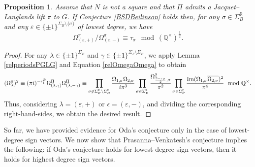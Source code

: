 \documentclass{amsart}
\newtheorem{proposition}[theorem]{Proposition}
\theoremstyle{definition}
\theoremstyle{remark}
\numberwithin{equation}{section}
\newcommand{\Q}{{\mathbb Q}}
\newcommand{\C}{{\mathbb C}}
\newcommand{\R}{{\mathbb R}}
\begin{document}
\begin{proposition}\label{Oda2}
 Assume that $N$ is not a square and that $\Pi$ admits a Jacquet--Langlands lift $\pi$ to $G$. If  Conjecture \ref{BSDBeilinson} holds then, for any $\sigma\in\Sigma_B^\R$ and any $\varepsilon\in\{\pm 1\}^{\Sigma_B\setminus\{\sigma\}}$ of lowest degree, we have 
\[
 \Omega^\pi_{(\varepsilon,+)}/\Omega^\pi_{(\varepsilon,-)}\equiv \tau_\sigma\mod(\Q^\times)^{\frac{1}{2}}.
\]
\end{proposition} 
\begin{proof}
For any $\lambda\in\{\pm 1\}^{\Sigma_B}$ and $\gamma\in\{\pm 1\}^{\Sigma_F\setminus\Sigma_B}$, we apply Lemma \ref{relperiodsPGLG} and Equation \eqref{relOmegaOmega} to obtain
\begin{equation}\label{RelOmegaGOmega}
    (\Omega_\lambda^\pi)^2\equiv (\pi i)^{-r_1^B}\Omega_{(\lambda,\gamma)}^\Pi\Omega_{(\lambda,-\gamma)}^\Pi\equiv\prod_{\sigma\not\in\Sigma_F^\R\setminus\Sigma_B^\R}\frac{\Omega_{1,\sigma}\Omega_{2,\sigma}}{i\pi^{3}}\prod_{\sigma\in\Sigma_B^\R}\frac{\Omega^2_{\frac{3-\varepsilon_\sigma}{2},\sigma}}{\pi^2}\prod_{\sigma\in\Sigma_F^\C}\frac{{\rm Im}(\Omega_{1,\sigma}\overline{\Omega_{2,\sigma}})^2}{\pi^4}\mod \Q^\times.
\end{equation}
Thus, considering $\lambda=(\varepsilon,+)$ or $\epsilon=(\varepsilon,-)$, and dividing the corresponding right-hand-sides, we obtain the desired result.
\end{proof}




So far, we have provided evidence for Oda's conjecture only in the case of lowest-degree sign vectors. We now show that Prasanna--Venkatesh's conjecture implies the following: if Oda's conjecture holds for lowest degree sign vectors, then it holds for highest degree sign vectors.
\end{document}
